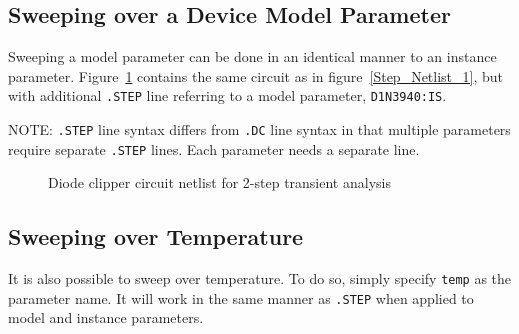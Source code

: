\subsection{Sweeping over a Device Model Parameter}
\label{step_ModelParam}

Sweeping a model parameter can be done in an identical manner to an
instance parameter.  Figure~\ref{Step_Netlist_2} contains the same
circuit as in figure~\ref{Step_Netlist_1}, but with additional
\verb|.STEP| line referring to a model parameter, \verb|D1N3940:IS|.

NOTE: \verb|.STEP| line syntax differs from \verb|.DC| line syntax in
that multiple parameters require separate \verb|.STEP| lines. Each
parameter needs a separate line.

\begin{figure}[htbp]
\begin{centering}
\caption{Diode clipper circuit netlist for 2-step transient
analysis\label{Step_Netlist_2}}
\end{centering}
\end{figure}

\subsection{Sweeping over Temperature}
\label{step_Temperature}

It is also possible to sweep over temperature.  To do so, simply
specify \verb|temp| as the parameter name.  It will work in the same
manner as \verb|.STEP| when applied to model and instance parameters.

